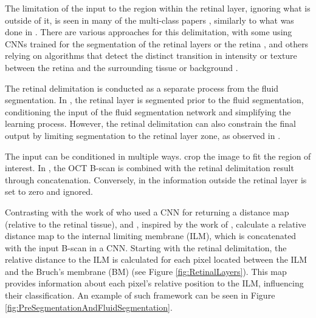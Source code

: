 \par
The limitation of the input to the region within the retinal layer, ignoring what is outside of it, is seen in many of the multi-class papers \parencite{Hassan2021b, Hassan2021a, Lu2019, Mantel2021, Rahil2023, Tang2022, Xing2022}, similarly to what was done in \textcite{Pawan2021}. There are various approaches for this delimitation, with some using CNNs trained for the segmentation of the retinal layers or the retina \parencite{Mantel2021, Tang2022}, and others relying on algorithms that detect the distinct transition in intensity or texture between the retina and the surrounding tissue or background \parencite{Hassan2021b, Hassan2021a, Lu2019, Rahil2023, Xing2022, Pawan2021}. 
\par
The retinal delimitation is conducted as a separate process from the fluid segmentation. In \parencite{Tang2022, Hassan2021b, Hassan2021a, Lu2019, Rahil2023, Xing2022}, the retinal layer is segmented prior to the fluid segmentation, conditioning the input of the fluid segmentation network and simplifying the learning process. However, the retinal delimitation can also constrain the final output by limiting segmentation to the retinal layer zone, as observed in \textcite{Mantel2021}.
\par
The input can be conditioned in multiple ways. \textcite{Xing2022} crop the image to fit the region of interest. In \parencite{Rahil2023, Tang2022, Lu2019}, the OCT B-scan is combined with the retinal delimitation result through concatenation. Conversely, in \parencite{Hassan2021b, Hassan2021a, Pawan2021} the information outside the retinal layer is set to zero and ignored. 
\par
Contrasting with the work of \textcite{Liu2021} who used a CNN for returning a distance map (relative to the retinal tissue), \textcite{Tang2022} and \textcite{Rahil2023}, inspired by the work of \textcite{Lu2019}, calculate a relative distance map to the internal limiting membrane (ILM), which is concatenated with the input B-scan in a CNN. Starting with the retinal delimitation, the relative distance to the ILM is calculated for each pixel located between the ILM and the Bruch's membrane (BM) (see Figure \ref{fig:RetinalLayers}). This map provides information about each pixel's relative position to the ILM, influencing their classification. An example of such framework can be seen in Figure \ref{fig:PreSegmentationAndFluidSegmentation}.
\par
